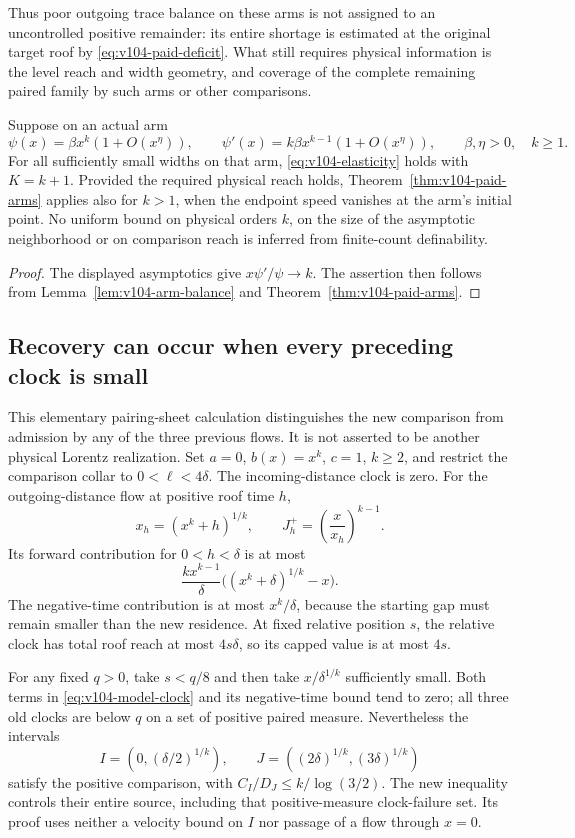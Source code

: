 Thus poor outgoing trace balance on these arms is not assigned to an
uncontrolled positive remainder: its entire shortage is estimated at
the original target roof by \eqref{eq:v104-paid-deficit}. What still
requires physical information is the level reach and width geometry,
and coverage of the complete remaining paired family by such arms or
other comparisons.

\begin{corollary}
\label{cor:v104-finite-order}
Suppose on an actual arm
\[
 \psi(x)=\beta x^k(1+O(x^\eta)),\qquad
 \psi'(x)=k\beta x^{k-1}(1+O(x^\eta)),
 \qquad \beta,\eta>0,\quad k\ge1.
\]
For all sufficiently small widths on that arm,
\eqref{eq:v104-elasticity} holds with $K=k+1$. Provided the required
physical reach holds, Theorem~\ref{thm:v104-paid-arms}
applies also for $k>1$, when the endpoint speed vanishes at the arm's
initial point. No uniform bound on physical orders $k$, on the size
of the asymptotic neighborhood or on comparison reach is inferred
from finite-count definability.
\end{corollary}
\begin{proof}
The displayed asymptotics give $x\psi'/\psi\to k$. The assertion
then follows from Lemma~\ref{lem:v104-arm-balance} and
Theorem~\ref{thm:v104-paid-arms}.
\end{proof}

\subsection{Recovery can occur when every preceding clock is small}
This elementary pairing-sheet calculation distinguishes the new
comparison from admission by any of the three previous flows. It is
not asserted to be another physical Lorentz realization. Set
$a=0$, $b(x)=x^k$, $c=1$, $k\ge2$, and restrict the comparison
collar to $0<\ell<4\delta$. The incoming-distance clock is zero.
For the outgoing-distance flow at positive roof time $h$,
\[
 x_h=(x^k+h)^{1/k},\qquad
 J_h^+=\left(\frac{x}{x_h}\right)^{k-1}.
\]
Its forward contribution for $0<h<\delta$ is at most
\begin{equation}\label{eq:v104-model-clock}
 \frac{kx^{k-1}}{\delta}
        \bigl((x^k+\delta)^{1/k}-x\bigr).
\end{equation}
The negative-time contribution is at most $x^k/\delta$, because
the starting gap must remain smaller than the new residence. At
fixed relative position $s$, the relative clock has total roof reach
at most $4s\delta$, so its capped value is at most $4s$.

For any fixed $q>0$, take $s<q/8$ and then take
$x/\delta^{1/k}$ sufficiently small. Both terms in
\eqref{eq:v104-model-clock} and its negative-time bound tend to zero;
all three old clocks are below $q$ on a set of positive paired
measure. Nevertheless the intervals
\[
 I=(0,(\delta/2)^{1/k}),\qquad
 J=((2\delta)^{1/k},(3\delta)^{1/k})
\]
satisfy the positive comparison, with
$C_I/D_J\le k/\log(3/2)$. The new inequality controls their entire
source, including that positive-measure clock-failure set. Its proof
uses neither a velocity bound on $I$ nor passage of a flow through
$x=0$.
